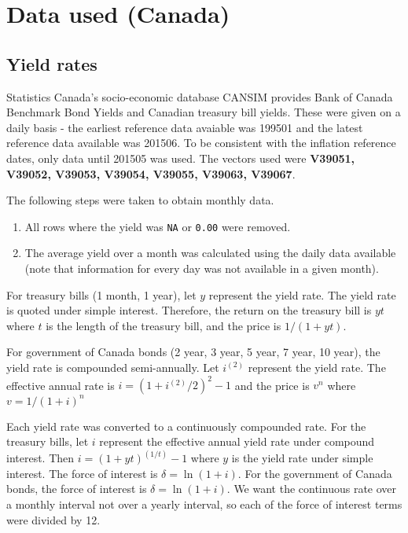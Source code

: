 \documentclass[12pt]{article}
\begin{document}


\section{Data used (Canada)}

\subsection{Yield rates}
Statistics Canada's socio-economic database CANSIM provides Bank of Canada
Benchmark Bond Yields and Canadian treasury bill yields. These were given on a
daily basis - the earliest reference data avaiable was 199501 and the latest
reference data available was 201506. To be consistent with the inflation
reference dates, only data until 201505 was used. The vectors used were \textbf{V39051,
V39052, V39053, V39054, V39055, V39063, V39067}.

\medskip
The following steps were taken to obtain monthly data. 
\begin{enumerate}
	\item All rows where the yield was \texttt{NA} or \texttt{0.00} were
		removed.
	\item The average yield over a month was calculated using the daily data
		available (note that information for every day was not available in a
		given month).
\end{enumerate}

For treasury bills (1 month, 1 year), let $y$ represent the yield rate. The
yield rate is quoted under simple interest. Therefore, the return on the
treasury bill is $yt$ where $t$ is the length of the treasury bill, and the
price is $1 / (1+yt)$.

\medskip
For government of Canada bonds (2 year, 3 year, 5 year, 7 year, 10 year), the yield rate is compounded semi-annually. Let
$i^{(2)}$ represent the yield rate. The effective annual rate is $i = (1+
i^{(2)}/2)^2 - 1$ and the
price is $v^{n}$ where $v = 1/(1+i)^n$

\medskip
Each yield rate was converted to a continuously compounded rate. For the treasury
bills, let $i$ represent the effective annual yield rate under compound
interest. Then $i = (1+yt)^{(1/t)} - 1$ where $y$ is the yield rate under simple
interest. The force of interest is $\delta = \ln(1+i)$. For the government of
Canada bonds, the force of interest is $\delta = \ln(1+i)$. We want the
continuous rate over a monthly interval not over a yearly interval, so each of
the force of interest terms were divided by 12.
\end{document}
